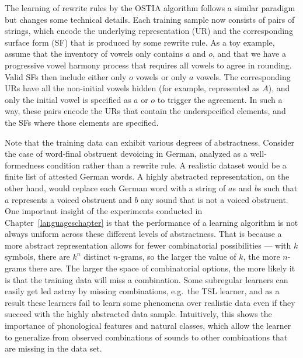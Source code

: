 The learning of rewrite rules by the OSTIA algorithm follows a similar paradigm but changes some technical details.
Each training sample now consists of pairs of strings, which encode the underlying representation (UR) and the corresponding surface form (SF) that is produced by some rewrite rule.
As a toy example, assume that the inventory of vowels only contains $a$ and $o$, and that we have a progressive vowel harmony process that requires all vowels to agree in rounding.
Valid SFs then include either only $o$ vowels or only $a$ vowels.
The corresponding URs have all the non-initial vowels hidden (for example, represented as $A$), and only the initial vowel is specified as $a$ or $o$ to trigger the agreement.
In such a way, these pairs encode the URs that contain the underspecified elements, and the SFs where those elements are specified.

Note that the training data can exhibit various degrees of abstractness.
Consider the case of word-final obstruent devoicing in German, analyzed as a well-formedness condition rather than a rewrite rule.
A realistic dataset would be a finite list of attested German words.
A highly abstracted representation, on the other hand, would replace each German word with a string of $a$s and $b$s such that $a$ represents a voiced obstruent and $b$ any sound that is not a voiced obstruent.
One important insight of the experiments conducted in Chapter~\ref{languageschapter} is that the performance of a learning algorithm is not always uniform across these different levels of abstractness.
That is because a more abstract representation allows for fewer combinatorial possibilities --- with $k$ symbols, there are $k^n$ distinct $n$-grams, so the larger the value of $k$, the more $n$-grams there are.
The larger the space of combinatorial options, the more likely it is that the training data will miss a combination. 
Some subregular learners can easily get led astray by missing combinations, e.g.~the TSL learner, and as a result these learners fail to learn some phenomena over realistic data even if they succeed with the highly abstracted data sample.
Intuitively, this shows the importance of phonological features and natural classes, which allow the learner to generalize from observed combinations of sounds to other combinations that are missing in the data set.


